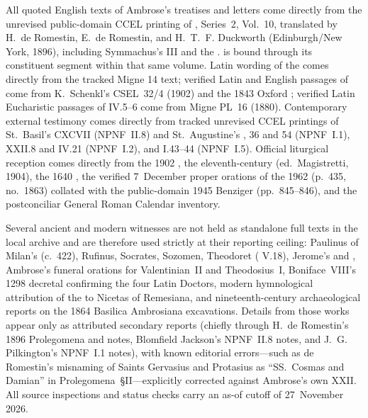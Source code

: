 All quoted English texts of Ambrose's treatises and letters come directly from the unrevised public-domain CCEL printing of , Series~2, Vol.~10, translated by H.~de Romestin, E.~de Romestin, and H.~T.~F. Duckworth (Edinburgh/New York, 1896), including Symmachus's  III and the .  is bound through its constituent segment within that same volume. Latin wording of the  comes directly from the tracked Migne  14 text; verified Latin and English passages of  come from K.~Schenkl's CSEL~32/4 (1902) and the 1843 Oxford ; verified Latin Eucharistic passages of  IV.5--6 come from Migne PL~16 (1880). Contemporary external testimony comes directly from tracked unrevised CCEL printings of St.~Basil's  CXCVII (NPNF~II.8) and St.~Augustine's ,  36 and 54 (NPNF~I.1),  XXII.8 and  IV.21 (NPNF~I.2), and  I.43--44 (NPNF~I.5). Official liturgical reception comes directly from the 1902 , the eleventh-century  (ed.\ Magistretti, 1904), the 1640 , the verified 7~December proper orations of the 1962  (p.~435, no.~1863) collated with the public-domain 1945 Benziger  (pp.~845--846), and the postconciliar General Roman Calendar inventory.

Several ancient and modern witnesses are not held as standalone full texts in the local archive and are therefore used strictly at their reporting ceiling: Paulinus of Milan's  (c.~422), Rufinus, Socrates, Sozomen, Theodoret ( V.18), Jerome's  and , Ambrose's funeral orations for Valentinian~II and Theodosius~I, Boniface~VIII's 1298 decretal confirming the four Latin Doctors, modern hymnological attribution of the  to Nicetas of Remesiana, and nineteenth-century archaeological reports on the 1864 Basilica Ambrosiana excavations. Details from those works appear only as attributed secondary reports (chiefly through H.~de Romestin's 1896 Prolegomena and notes, Blomfield Jackson's NPNF~II.8 notes, and J.~G. Pilkington's NPNF~I.1 notes), with known editorial errors---such as de Romestin's misnaming of Saints Gervasius and Protasius as ``SS.\ Cosmas and Damian'' in Prolegomena~\S II---explicitly corrected against Ambrose's own  XXII. All source inspections and status checks carry an as-of cutoff of 27~November 2026.


